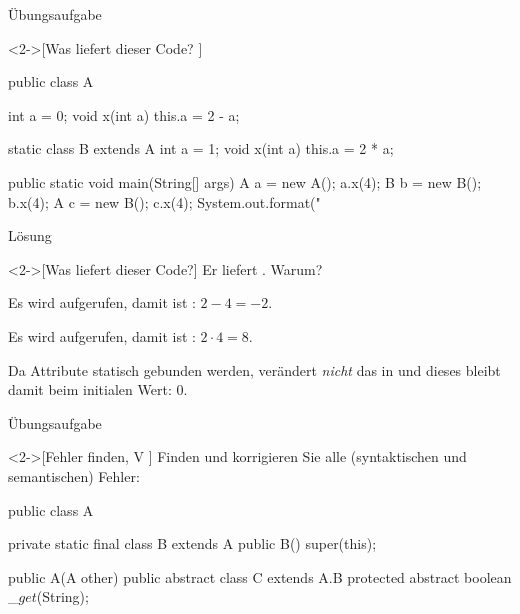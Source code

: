 \begin{frame}[c,fragile]{Übungsaufgabe}
    \begin{exercise}<2->[Was liefert dieser Code? ]\label{tsk:java-bindings-result}
\begin{plainjava}[morekeywords={[3]{A,B}}]
public class A {
    int a = 0;
    void x(int a) { this.a = 2 - a; }

    static class B extends A {
        int a = 1;
        void x(int a) { this.a = 2 * a; }
    }

    public static void main(String[] args) {
        A a = new A(); a.x(4);
        B b = new B(); b.x(4);
        A c = new B(); c.x(4);
        System.out.format("%
    }
}
\end{plainjava}
    \end{exercise}
\end{frame}

\begin{frame}[c]{Lösung}
    \begin{solve}<2->[Was liefert dieser Code?]
        Er liefert . Warum?
        \begin{description}[XX:]
            \item[-2] Es wird  aufgerufen, damit ist : \(2 - 4 = -2\).
            \item[8] Es wird  aufgerufen, damit ist : \(2 \cdot 4 = 8\).
            \item[0] Da Attribute statisch gebunden werden, verändert  \emph{nicht} das  in  und dieses bleibt damit beim initialen Wert: \(0\).
        \end{description}
    \end{solve}
\end{frame}

\begin{frame}[c,fragile]{Übungsaufgabe}
    \begin{exercise}<2->[Fehler finden, V ]
        \pause{}Finden und korrigieren Sie alle (syntaktischen und semantischen) Fehler:\pause{}
{\footnotesize
        \begin{plainvoid}
public class A {
    private static final class B extends A {
        public B() {
            super(this);
        }
    }

    public A(A other){}
    public abstract class C extends A.B {
        protected abstract boolean _$get$(String);
    }
}
        \end{plainvoid}
}
    \end{exercise}
\end{frame}

